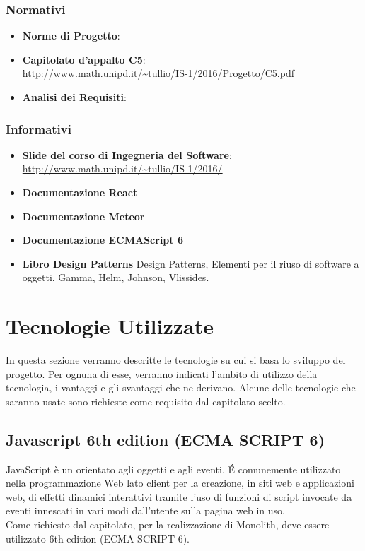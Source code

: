 \subsubsection{Normativi}
\begin{itemize}
	\item \textbf{Norme di Progetto}: \normediprogetto
	\item \textbf{Capitolato d'appalto C5}: \\ \url{http://www.math.unipd.it/~tullio/IS-1/2016/Progetto/C5.pdf}
	\item \textbf{Analisi dei Requisiti}: \analisideirequisiti
	
\end{itemize}


\subsubsection{Informativi}
\begin{itemize}
	\item \textbf{Slide del corso di Ingegneria del Software}:
     \\  \url{http://www.math.unipd.it/~tullio/IS-1/2016/ }
\item \textbf{Documentazione React}
\item \textbf{Documentazione Meteor}
\item \textbf{Documentazione ECMAScript 6} 
\item \textbf{Libro Design Patterns} Design Patterns, Elementi per il
  riuso di software a oggetti. Gamma, Helm, Johnson, Vlissides.

\end{itemize}

\section{Tecnologie Utilizzate}

In questa sezione verranno descritte le tecnologie su cui si basa lo
sviluppo del progetto. Per ognuna di esse, verranno indicati l’ambito
di utilizzo della tecnologia, i vantaggi e gli svantaggi che ne
derivano. Alcune delle tecnologie che saranno usate sono richieste come requisito dal capitolato scelto.

\subsection{Javascript 6th edition (ECMA SCRIPT 6)}

JavaScript è un  orientato agli oggetti e agli
eventi. \'E comunemente utilizzato nella programmazione Web lato
client per la creazione, in siti web e applicazioni web, di effetti
dinamici interattivi tramite l'uso di funzioni di script invocate da
eventi innescati in vari modi dall'utente sulla pagina web in
uso. \\ Come richiesto dal capitolato, per la realizzazione di
Monolith, deve essere utilizzato  6th edition (ECMA SCRIPT
6). \\ 

